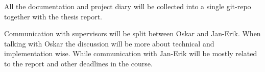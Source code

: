 All the documentation and project diary will be collected into a single git-repo together with the thesis report. 

Communication with supervisors will be split between Oskar and Jan-Erik. When talking with Oskar the discussion will be more about technical and implementation wise. While communication with Jan-Erik will be mostly related to the report and other deadlines in the course. 

